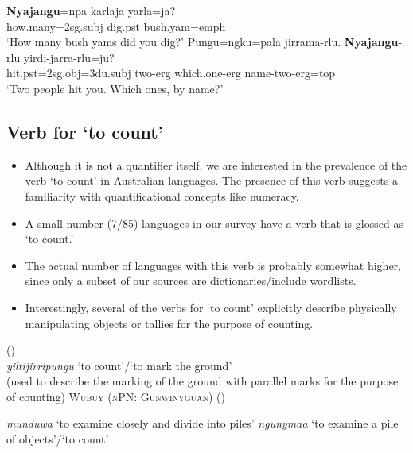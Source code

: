 \documentclass{article}
\makeatletter
\newcommand{\ofy}{/85} %
\makeatother
\begin{document}
\begin{exe}
  \begin{xlist}
    \ex \gll \textbf{Nyajangu}=npa karlaja yarla=ja? \\
    how.many=2{\sc sg.subj} dig.{\sc pst} bush.yam={\sc emph}\\
    \glt `How many bush yams did you dig?'
    \ex \gll Pungu=ngku=pala jirrama-rlu. \textbf{Nyajangu}-rlu yirdi-jarra-rlu=ju? \\
    hit.{\sc pst}=2{\sc sg.obj}=3{\sc du.subj} two-{\sc erg} which.one-{\sc erg} name-two-{\sc erg}={\sc top}\\
    \glt `Two people hit you. Which ones, by name?'
  \end{xlist}
\end{exe}


\subsection{Verb for `to count'}
\begin{itemize}
\item Although it is not a quantifier itself, we are interested in the prevalence of the verb `to count' in Australian languages. The presence of this verb suggests a familiarity with quantificational concepts like numeracy.
\item A small number (7\ofy) languages in our survey have a verb that is glossed as `to count.'
\item The actual number of languages with this verb is probably somewhat higher, since only a subset of our sources are dictionaries/include wordlists.
\item Interestingly, several of the verbs for `to count' explicitly describe physically manipulating objects or tallies for the purpose of counting.
\end{itemize}

\begin{exe}
   (\citealt[179]{pintupi77})\\
  \textit{yiltijirripungu} `to count'/`to mark the ground'\\
  (used to describe the marking of the ground with parallel marks for the purpose of counting)
  \ex \textsc{Wubuy (nPN: Gunwinyguan)} (\citealt{nuydict})
  \begin{xlist}
    \ex \textit{munduwa} `to examine closely and divide into piles' 
    \ex \textit{ngunymaa} `to examine a pile of objects'/`to count'
  \end{xlist}
\end{exe} 
\end{document}
